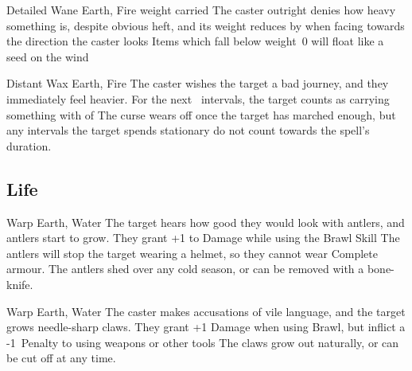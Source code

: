 \begin{multicols}{2}
{  %
    {Detailed}%
    {Wane}%
    {Earth, Fire}%
    {\gls{weight} carried}%
    {The caster outright denies how heavy something is, despite obvious heft, and its \gls{weight} reduces by  when facing towards the direction the caster looks}%
    {Items which fall below \gls{weight}~0 will float like a seed on the wind}

    {Distant}%
    {Wax}%
    {Earth, Fire}%
    {}%
    {The caster wishes the target a bad journey, and they immediately feel heavier.
    For the next ~\glspl{interval}, the target counts as carrying something with  of }%
    {
    The curse wears off once the target has marched enough, but any \glspl{interval} the target spends stationary do not count towards the spell's duration.}






  \subsection{Life}
  \label{lifeSpells}


    {}%
    {Warp}%
    {Earth, Water}%
    {}%
    {The target hears how good they would look with antlers, and antlers start to grow.
    They grant +1 to Damage while using the Brawl Skill}%
    {
    The antlers will stop the target wearing a helmet, so they cannot wear Complete armour.
    The antlers shed over any cold season, or can be removed with a bone-knife.}

    {}%
    {Warp}%
    {Earth, Water}%
    {}%
    {The caster makes accusations of vile language, and the target grows needle-sharp claws.
    They grant +1 Damage when using Brawl, but inflict a -1~Penalty to using weapons or other tools}%
    {
    The claws grow out naturally, or can be cut off at any time.}

}
\end{multicols}
